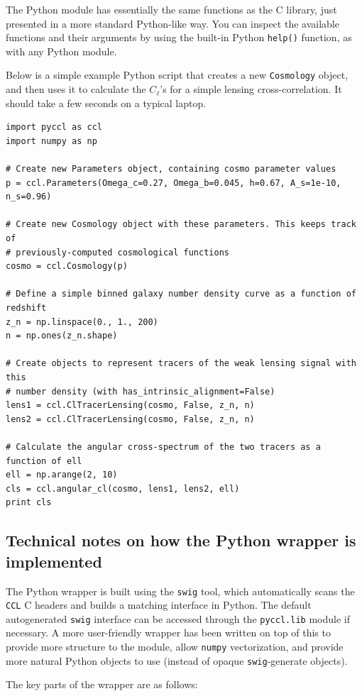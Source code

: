 \documentclass[\docopts]{\docclass}
\begin{document}
The Python module has essentially the same functions as the C library, just presented in a more standard Python-like way. You can inspect the available functions and their arguments by using the built-in Python {\tt help()} function, as with any Python module.

Below is a simple example Python script that creates a new {\tt Cosmology} object, and then uses it to calculate the $C_\ell$'s for a simple lensing cross-correlation. It should take a few seconds on a typical laptop.

\begin{verbatim}
import pyccl as ccl
import numpy as np

# Create new Parameters object, containing cosmo parameter values
p = ccl.Parameters(Omega_c=0.27, Omega_b=0.045, h=0.67, A_s=1e-10, n_s=0.96)

# Create new Cosmology object with these parameters. This keeps track of 
# previously-computed cosmological functions
cosmo = ccl.Cosmology(p)

# Define a simple binned galaxy number density curve as a function of redshift
z_n = np.linspace(0., 1., 200)
n = np.ones(z_n.shape)

# Create objects to represent tracers of the weak lensing signal with this 
# number density (with has_intrinsic_alignment=False)
lens1 = ccl.ClTracerLensing(cosmo, False, z_n, n)
lens2 = ccl.ClTracerLensing(cosmo, False, z_n, n)

# Calculate the angular cross-spectrum of the two tracers as a function of ell
ell = np.arange(2, 10)
cls = ccl.angular_cl(cosmo, lens1, lens2, ell)
print cls
\end{verbatim}

\subsection{Technical notes on how the Python wrapper is implemented}
\label{sec:python:technical}

The Python wrapper is built using the {\tt swig} tool, which automatically scans the {\tt CCL} C headers and builds a matching interface in Python. The default autogenerated {\tt swig} interface can be accessed through the {\tt pyccl.lib} module if necessary. A more user-friendly wrapper has been written on top of this to provide more structure to the module, allow {\tt numpy} vectorization, and provide more natural Python objects to use (instead of opaque {\tt swig}-generate objects).

The key parts of the wrapper are as follows:
\end{document}
